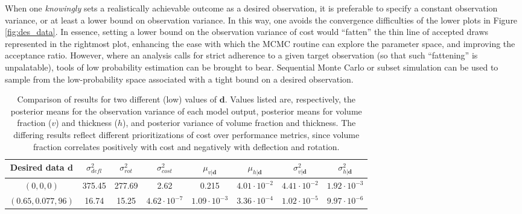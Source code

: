 \documentclass{article}
\begin{document}
When one \emph{knowingly} sets a realistically achievable outcome as a desired observation, it is preferable to specify a constant observation variance, or at least a lower bound on observation variance. In this way, one avoids the convergence difficulties of the lower plots in Figure \ref{fig:des_data}. In essence, setting a lower bound on the observation variance of cost would ``fatten'' the thin line of accepted draws represented in the rightmost plot, enhancing the ease with which the MCMC routine can explore the parameter space, and improving the acceptance ratio. However, where an analysis calls for strict adherence to a given target observation (so that such ``fattening'' is unpalatable), tools of low probability estimation can be brought to bear. Sequential Monte Carlo or subset simulation can be used to sample from the low-probability space associated with a tight bound on a desired observation.
\begin{table}[h]
\centering
\begin{tabular}{| c | c  | c  |  c | c  | c | c | c |}
\hline
Desired data $\mathbf d$ & $\sigma^2_{defl}$ & $\sigma^2_{rot}$ & $\sigma^2_{cost}$ & $\mu_{v|\mathbf d}$ &
                            $\mu_{h|\mathbf d}$ & $\sigma^2_{v|\mathbf d}$ & $\sigma^2_{h|\mathbf d}$\\
\hline
$(0, 0, 0)$ & 375.45 & 277.69 & 2.62 & 0.215 & $4.01 \cdot 10^{-2}$&
	$4.41\cdot 10^{-2}$ & $1.92 \cdot 10^{-3}$\\
$(0.65, 0.077, 96)$ & 16.74 & 15.25 & $4.62 \cdot 10^{-7}$ &
	$1.09 \cdot 10^{-3}$ & $3.36 \cdot10^{-4}$ &
	$1.02 \cdot 10^{-5}$ & $9.97 \cdot 10^{-6}$\\
\hline
\end{tabular}
\captionsetup{width=.95\linewidth}
\caption{Comparison of results for two different (low) values of $\mathbf d$. Values listed are, respectively, the posterior means for the observation variance of each model output, posterior means for volume fraction ($v$) and thickness ($h$), and posterior variance of volume fraction and thickness. The differing results reflect different prioritizations of cost over performance metrics, since volume fraction correlates positively with cost and negatively with deflection and rotation.}
\label{table:d_comp}
\end{table}
\end{document}

